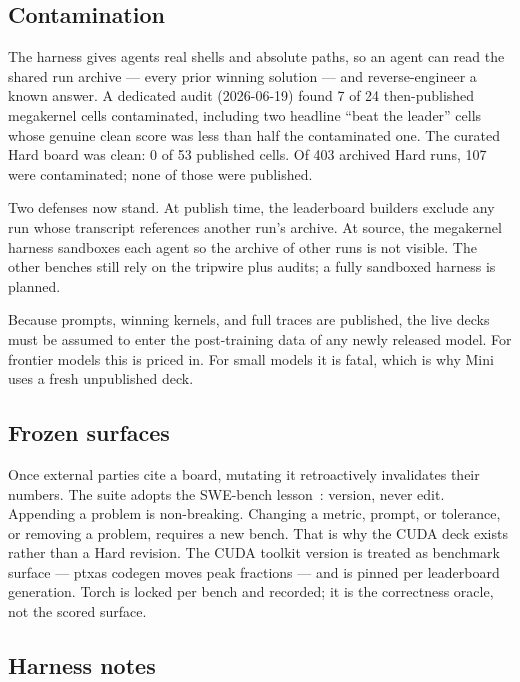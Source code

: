 \documentclass[11pt]{article}
\begin{document}
\subsection{Contamination}
\label{sec:contamination}

The harness gives agents real shells and absolute paths, so an agent can read the shared run archive --- every prior winning solution --- and reverse-engineer a known answer. A dedicated audit (2026-06-19) found 7 of 24 then-published megakernel cells contaminated, including two headline ``beat the leader'' cells whose genuine clean score was less than half the contaminated one. The curated Hard board was clean: 0 of 53 published cells. Of 403 archived Hard runs, 107 were contaminated; none of those were published.

Two defenses now stand. At publish time, the leaderboard builders exclude any run whose transcript references another run's archive. At source, the megakernel harness sandboxes each agent so the archive of other runs is not visible. The other benches still rely on the tripwire plus audits; a fully sandboxed harness is planned.

Because prompts, winning kernels, and full traces are published, the live decks must be assumed to enter the post-training data of any newly released model. For frontier models this is priced in. For small models it is fatal, which is why Mini uses a fresh unpublished deck.

\subsection{Frozen surfaces}
\label{sec:frozen}

Once external parties cite a board, mutating it retroactively invalidates their numbers. The suite adopts the SWE-bench lesson~\citep{jimenez2024swebench}: version, never edit. Appending a problem is non-breaking. Changing a metric, prompt, or tolerance, or removing a problem, requires a new bench. That is why the CUDA deck exists rather than a Hard revision. The CUDA toolkit version is treated as benchmark surface --- ptxas codegen moves peak fractions --- and is pinned per leaderboard generation. Torch is locked per bench and recorded; it is the correctness oracle, not the scored surface.

\subsection{Harness notes}
\label{sec:harness}
\end{document}
